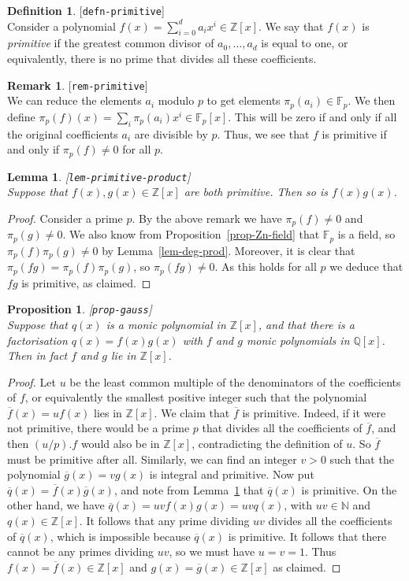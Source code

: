 \documentclass{amsart}
\newcommand{\lbl}[1]{\label{#1}\textup{[\texttt{#1}]}\ \\}
\newcommand{\lbl}{\label}
\newcommand{\N}         {{\mathbb{N}}}
\newcommand{\Z}         {{\mathbb{Z}}}
\newcommand{\Q}         {{\mathbb{Q}}}
\newcommand{\F}         {{\mathbb{F}}}
\newcommand{\ov}[1]     {\overline{#1}}
\renewcommand{\:}{\colon}
\newtheorem{lemma}[theorem]{Lemma}
\newtheorem{proposition}[theorem]{Proposition}
\theoremstyle{definition}
\newtheorem{remark}[theorem]{Remark}
\newtheorem{definition}[theorem]{Definition}
\begin{document}
\begin{definition}\lbl{defn-primitive}
 Consider a polynomial $f(x)=\sum_{i=0}^da_ix^i\in\Z[x]$.  We say that
 $f(x)$ is \emph{primitive} if the greatest common divisor of
 $a_0,\dotsc,a_d$ is equal to one, or equivalently, there is no prime
 that divides all these coefficients.
\end{definition}
\begin{remark}\lbl{rem-primitive}
 We can reduce the elements $a_i$ modulo $p$ to get elements
 $\pi_p(a_i)\in\F_p$.  We then define
 $\pi_p(f)(x)=\sum_i\pi_p(a_i)x^i\in\F_p[x]$.  This will be zero if
 and only if all the original coefficients $a_i$ are divisible by
 $p$.  Thus, we see that $f$ is primitive if and only if
 $\pi_p(f)\neq 0$ for all $p$.
\end{remark}
\begin{lemma}\lbl{lem-primitive-product}
 Suppose that $f(x),g(x)\in\Z[x]$ are both primitive.  Then so is
 $f(x)g(x)$.  
\end{lemma}
\begin{proof}
 Consider a prime $p$.  By the above remark we have $\pi_p(f)\neq 0$
 and $\pi_p(g)\neq 0$.  We also know from
 Proposition~\ref{prop-Zn-field} that $\F_p$ is a field, so
 $\pi_p(f)\pi_p(g)\neq 0$ by Lemma~\ref{lem-deg-prod}.  Moreover, it
 is clear that $\pi_p(fg)=\pi_p(f)\pi_p(g)$, so $\pi_p(fg)\neq 0$.  As
 this holds for all $p$ we deduce that $fg$ is primitive, as claimed. 
\end{proof}
\begin{proposition}\lbl{prop-gauss}
 Suppose that $q(x)$ is a monic polynomial in $\Z[x]$, and that there
 is a factorisation $q(x)=f(x)g(x)$ with $f$ and $g$ monic polynomials
 in $\Q[x]$.  Then in fact $f$ and $g$ lie in $\Z[x]$.
\end{proposition}
\begin{proof}
 Let $u$ be the least common multiple of the denominators of the
 coefficients of $f$, or equivalently the smallest positive integer
 such that the polynomial $\ov{f}(x)=uf(x)$ lies in $\Z[x]$.  We claim
 that $\ov{f}$ is primitive.  Indeed, if it were not primitive, there
 would be a prime $p$ that divides all the coefficients of $\ov{f}$, and then
 $(u/p).f$ would also be in $\Z[x]$, contradicting the definition of
 $u$.  So $\ov{f}$ must be primitive after all.  Similarly, we can
 find an integer $v>0$ such that the polynomial $\ov{g}(x)=vg(x)$ is
 integral and primitive.  Now put $\ov{q}(x)=\ov{f}(x)\ov{g}(x)$, and
 note from Lemma~\ref{lem-primitive-product} that $\ov{q}(x)$ is
 primitive.  On the other hand, we have 
 $\ov{q}(x)=uvf(x)g(x)=uvq(x)$, with $uv\in\N$ and $q(x)\in\Z[x]$.  It
 follows that any prime dividing $uv$ divides all the coefficients of
 $\ov{q}(x)$, which is impossible because $\ov{q}(x)$ is primitive.
 It follows that there cannot be any primes dividing $uv$, so we must
 have $u=v=1$.  Thus $f(x)=\ov{f}(x)\in\Z[x]$ and
 $g(x)=\ov{g}(x)\in\Z[x]$ as claimed.
\end{proof}
\end{document}
